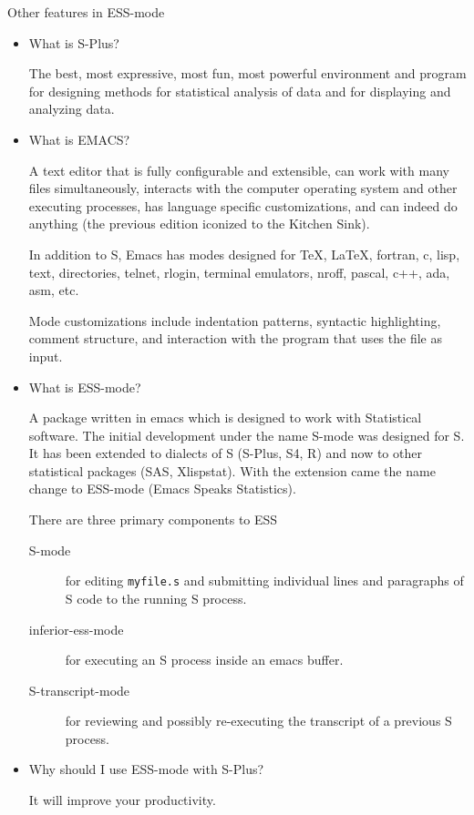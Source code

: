 \documentclass[12pt]{article}   %
\begin{document}
Other features in ESS-mode

\newpage
\begin{itemize}
\item
What is S-Plus?

The best, most expressive, most fun, most powerful environment and
program for designing methods for statistical analysis of data and for
displaying and analyzing data.

\newpage
\item
What is EMACS?

A text editor that is fully configurable and extensible, can work with
many files simultaneously, interacts with the computer operating
system and other executing processes, has language specific
customizations, and can indeed do anything (the previous edition
iconized to the Kitchen Sink).

In addition to S, Emacs has modes designed for \TeX, \LaTeX, fortran,
c, lisp, text, directories, telnet, rlogin, terminal emulators, nroff,
pascal, c++, ada, asm, etc.

Mode customizations include indentation patterns, syntactic
highlighting, comment structure, and interaction with the program that
uses the file as input.

\newpage
\item
What is ESS-mode?

A package written in emacs which is designed to work with Statistical
software.  The initial development under the name S-mode was designed
for S.  It has been extended to dialects of S (S-Plus, S4, R) and now
to other statistical packages (SAS, Xlispstat).  With the extension
came the name change to ESS-mode (Emacs Speaks Statistics).

There are three primary components to ESS
\begin{description}
\item [S-mode] for editing {\tt myfile.s} and submitting individual
lines and paragraphs of S code to the running S process.
\item [inferior-ess-mode]  for executing an S process inside an emacs buffer.
\item [S-transcript-mode] for reviewing and possibly re-executing the
transcript of a previous S process.
\end{description}


\item
Why should I use ESS-mode with S-Plus?

It will improve your productivity.



\end{itemize}
\end{document}
